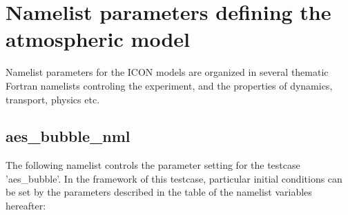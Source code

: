 
\section{Namelist parameters defining the atmospheric model}

Namelist parameters for the ICON models are organized in several thematic
Fortran namelists controling the experiment, and the properties of
dynamics, transport, physics etc.


\subsection{aes\_bubble\_nml}

The following namelist controls the parameter setting for the testcase
'aes\_bubble'. In the framework of this testcase, particular initial
conditions can be set by the parameters described in the table of the
namelist variables hereafter:

